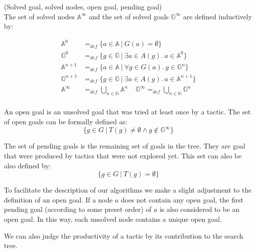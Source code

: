 \documentclass[runningheads,a4paper,draft]{svjour3}
\begin{document}
\begin{definition}\label{def:solved}(Solved goal, solved nodes, open goal, 
pending goal)\\
The set of solved nodes $\mathbb{A}^\infty$ and 
the set of solved goals $\mathbb{G}^\infty$ are defined inductively by:

\begin{align*}
\mathbb{A}^{0} &=_{def} 
\lbrace a \in \mathbb{A}\ |\ G(a) = \emptyset \rbrace \\ 
\mathbb{G}^{0} &=_{def} \lbrace g \in \mathbb{G}\ |\ 
\exists a \in A(g).\ a \in \mathbb{A}^{0} \rbrace\\
\mathbb{A}^{n+1} &=_{def} \lbrace a \in \mathbb{A}\ |\ 
\forall g \in G(a).\ g \in \mathbb{G}^{n} \rbrace\\
\mathbb{G}^{n+1} &=_{def} \lbrace g \in \mathbb{G}\ |\ 
\exists a \in A(g).\ a \in \mathbb{A}^{n+1} \rbrace \\
\mathbb{A}^\infty &=_{def} \bigcup_{n \in \mathbb{N}} \mathbb{A}^n \ \ \ \ \ 
\mathbb{G}^\infty =_{def} \bigcup_{n \in \mathbb{N}} \mathbb{G}^n\\
\end{align*}

An open goal is an unsolved goal that was tried at least once by a tactic. The 
set of open goals can be formally defined as:  
\[\lbrace g \in G\ |\  T(g) \neq \emptyset \wedge g \notin \mathbb{G}^\infty 
\rbrace\]

The set of pending goals is the remaining set of goals in the tree. They are 
goal that were produced by tactics that were not explored yet. This set can 
also be also defined by:
\[\lbrace g \in G\ |\  T(g) = \emptyset \rbrace\]

To facilitate the description  of our algorithms we make a slight adjustment 
to the definition of an open goal. If a node $a$ does not contain any open 
goal, the first pending goal (according 
to some preset order) of $a$ is also considered to be an open goal. In this 
way, each unsolved node contains a unique open goal.
\end{definition}


We can also judge the productivity of a tactic by its contribution to the 
search 
tree. 
\end{document}
